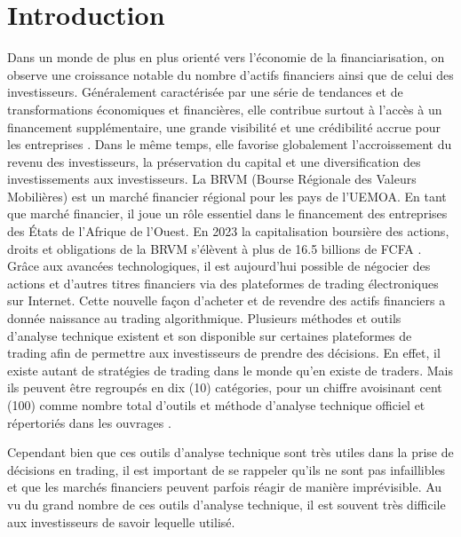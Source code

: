 \chapter*{Introduction}

\par{
    Dans un monde de plus en plus orienté vers l'économie de la 
    financiarisation, on observe une croissance notable du nombre 
    d'actifs financiers ainsi que de celui des investisseurs.
    Généralement caractérisée par une série de tendances et de 
    transformations économiques et financières, elle contribue 
    surtout à l'accès à un financement supplémentaire, 
    une grande visibilité et une crédibilité accrue pour les entreprises 
    \cite{1}.
    Dans le même temps, elle favorise globalement l'accroissement du 
    revenu des investisseurs, la préservation du capital et une 
    diversification des investissements aux investisseurs.
    La BRVM (Bourse Régionale des Valeurs Mobilières) est un marché 
    financier régional pour les pays de l'UEMOA. En tant que marché 
    financier, il joue un rôle essentiel dans le financement des 
    entreprises des États de l'Afrique de l'Ouest. En 2023 la 
    capitalisation boursière des actions, droits et obligations de 
    la BRVM s'élèvent à plus de 16.5 billions de FCFA 
    \cite{3}.
    Grâce aux avancées technologiques, il est aujourd'hui possible de 
    négocier des actions et d'autres titres financiers via des plateformes 
    de trading électroniques sur Internet. Cette nouvelle façon d'acheter 
    et de revendre des actifs financiers a donnée naissance au trading 
    algorithmique. Plusieurs méthodes et outils d'analyse technique existent
    et son disponible sur certaines plateformes de trading afin de 
    permettre aux investisseurs de prendre des décisions. En effet, il 
    existe autant de stratégies de trading dans le monde qu'en existe de 
    traders. Mais ils peuvent être regroupés en dix (10) catégories, pour 
    un chiffre avoisinant cent (100) comme nombre total d'outils et 
    méthode d'analyse technique officiel et répertoriés dans les ouvrages 
    \cite{2}. }

\par{
    Cependant bien que ces outils d'analyse technique sont très utiles dans 
    la prise de décisions en trading, il est important de se rappeler qu'ils
     ne sont pas infaillibles et que les marchés financiers peuvent parfois 
    réagir de manière imprévisible. Au vu du grand nombre de ces outils 
    d'analyse technique, il est souvent très difficile aux investisseurs de 
    savoir lequelle utilisé.
    }

